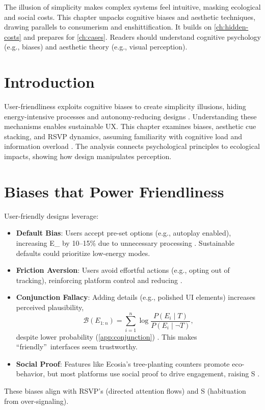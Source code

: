 \documentclass[openany]{book}
\newcommand{\vvec}{\mathbf{v}} %
\newcommand{\Sent}{S} %
\newcommand{\Eint}{E_{\mathrm{int}}} %
\newcommand{\Auton}{\mathcal{A}} %
\begin{document}
The illusion of simplicity makes complex systems feel intuitive, masking ecological and social costs. This chapter unpacks cognitive biases and aesthetic techniques, drawing parallels to consumerism and enshittification. It builds on \cref{ch:hidden-costs} and prepares for \cref{ch:cases}. Readers should understand cognitive psychology (e.g., biases) and aesthetic theory (e.g., visual perception).

\section{Introduction}
\label{sec:illusion-intro}
User-friendliness exploits cognitive biases to create simplicity illusions, hiding energy-intensive processes and autonomy-reducing designs \citep{colak2024,doctorow2022}. Understanding these mechanisms enables sustainable UX. This chapter examines biases, aesthetic cue stacking, and RSVP dynamics, assuming familiarity with cognitive load and information overload \citep{norman1988}. The analysis connects psychological principles to ecological impacts, showing how design manipulates perception.

\section{Biases that Power Friendliness}
\label{sec:biases}
User-friendly designs leverage:
\begin{itemize}
  \item \textbf{Default Bias}: Users accept pre-set options (e.g., autoplay enabled), increasing \Eint{} by 10--15\% due to unnecessary processing \citep{colak2024}. Sustainable defaults could prioritize low-energy modes.
  \item \textbf{Friction Aversion}: Users avoid effortful actions (e.g., opting out of tracking), reinforcing platform control and reducing \Auton{} \citep{doctorow2022}.
  \item \textbf{Conjunction Fallacy}: Adding details (e.g., polished UI elements) increases perceived plausibility,
  \begin{equation}
  \label{eq:believability}
  \mathcal{B}(E_{1:n}) = \sum_{i=1}^n \log \frac{P(E_i \mid T)}{P(E_i \mid \neg T)},
  \end{equation}
  despite lower probability (\cref{app:conjunction}) \citep{tversky1983}. This makes \textquotedblleft friendly\textquotedblright\ interfaces seem trustworthy.
  \item \textbf{Social Proof}: Features like Ecosia’s tree-planting counters promote eco-behavior, but most platforms use social proof to drive engagement, raising \Sent{} \citep{colak2024}.
\end{itemize}
These biases align with RSVP’s \vvec{} (directed attention flows) and \Sent{} (habituation from over-signaling).
\end{document}
